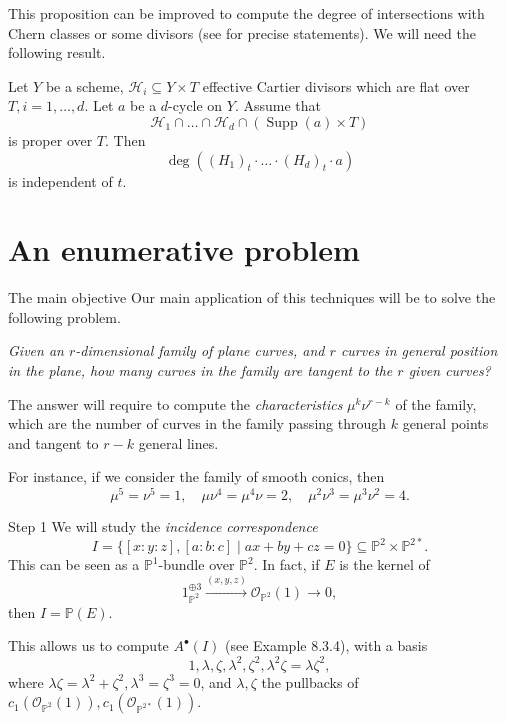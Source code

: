 \documentclass{beamer}
\renewcommand{\O}{\mathscr{O}}
\renewcommand{\P}{\mathbb{P}}
\renewcommand{\H}{\mathscr{H}}
\DeclareMathOperator{\Supp}{Supp}
\begin{document}
\begin{frame}
This proposition can be improved to compute the degree of intersections with Chern classes or some divisors (see  for precise statements). We will need the following result.

\begin{corollary}
Let $Y$ be a scheme, $\H_i \subseteq Y \times T$ effective Cartier divisors which are flat over $T, i=1, \dots, d$. Let $a$ be a $d$-cycle on $Y$. Assume that
\[ \H_1 \cap \dots \cap \H_d \cap (\Supp(a) \times T) \]
is proper over $T$. Then
\[ \deg((H_1)_t \cdot \dots \cdot (H_d)_t \cdot a) \]
is independent of $t$. 
\end{corollary}
\end{frame}



\section{An enumerative problem}



\begin{frame}{The main objective}
Our main application of this techniques will be to solve the following problem.
\begin{center}
\emph{Given an $r$-dimensional family of plane curves, and $r$ curves in general position in the plane, how many curves in the family are tangent to the $r$ given curves?}
\end{center}

\pause

The answer will require to compute the \emph{characteristics} $\mu^k \nu^{r-k}$ of the family, which are the number of curves in the family passing through $k$ general points and tangent to $r-k$ general lines. 

\pause 

For instance, if we consider the family of smooth conics, then
\[ \mu^5 = \nu^5 = 1, \quad \mu\nu^4=\mu^4\nu=2, \quad \mu^2\nu^3=\mu^3\nu^2=4. \]
\end{frame}



\begin{frame}{Step 1}
We will study the \emph{incidence correspondence} 
\[ I=\{[x:y:z], [a:b:c] \mid ax+by+cz=0\} \subseteq \P^2 \times \P^{2\ast}. \]
This can be seen as a $\P^1$-bundle over $\P^2$. In fact, if $E$ is the kernel of
\[ 1_{\P^2}^{\oplus 3} \xrightarrow{(x, y, z)} \O_{\P^2}(1) \to 0, \]
then $I=\P(E)$. 

\pause

This allows us to compute $A^\bullet(I)$ (see Example 8.3.4), with a basis 
\[ 1, \lambda, \zeta, \lambda^2, \zeta^2, \lambda^2\zeta=\lambda\zeta^2, \]
where $\lambda\zeta=\lambda^2+\zeta^2, \lambda^3=\zeta^3=0$, and $\lambda, \zeta$ the pullbacks of $c_1(\O_{\P^2}(1)), c_1(\O_{\P^{2\ast}}(1))$. 
\end{frame}
\end{document}
